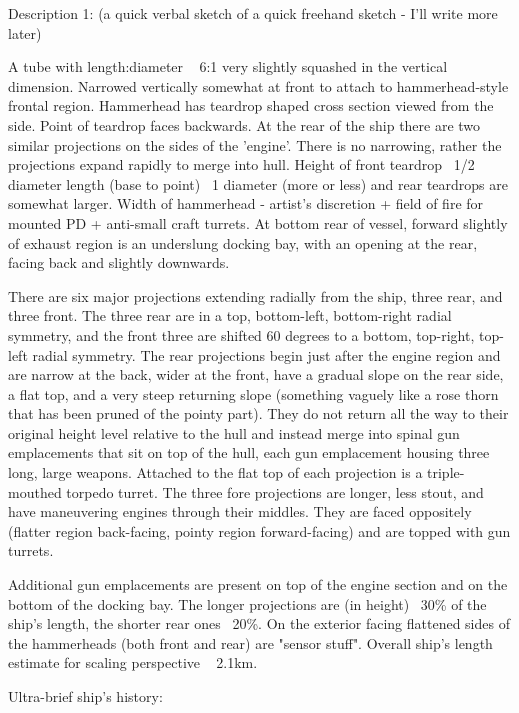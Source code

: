 Description 1: (a quick verbal sketch of a quick freehand sketch -
I'll write more later)

A tube with length:diameter ~ 6:1 very slightly squashed in the
vertical dimension. Narrowed vertically somewhat at front to attach to
hammerhead-style frontal region. Hammerhead has teardrop shaped cross
section viewed from the side. Point of teardrop faces backwards. At
the rear of the ship there are two similar projections on the sides of
the 'engine'. There is no narrowing, rather the projections expand
rapidly to merge into hull. Height of front teardrop ~1/2 diameter
length (base to point) ~1 diameter (more or less) and rear teardrops
are somewhat larger. Width of hammerhead - artist's discretion + field
of fire for mounted PD + anti-small craft turrets. At bottom rear of
vessel, forward slightly of exhaust region is an underslung docking
bay, with an opening at the rear, facing back and slightly downwards.

There are six major projections extending radially from the ship,
three rear, and three front. The three rear are in a top, bottom-left,
bottom-right radial symmetry, and the front three are shifted 60
degrees to a bottom, top-right, top-left radial symmetry. The rear
projections begin just after the engine region and are narrow at the
back, wider at the front, have a gradual slope on the rear side, a
flat top, and a very steep returning slope (something vaguely like a
rose thorn that has been pruned of the pointy part). They do not
return all the way to their original height level relative to the hull
and instead merge into spinal gun emplacements that sit on top of the
hull, each gun emplacement housing three long, large weapons.
Attached to the flat top of each projection is a triple-mouthed
torpedo turret. The three fore projections are longer, less stout, and
have maneuvering engines through their middles. They are faced
oppositely (flatter region back-facing, pointy region forward-facing)
and are topped with gun turrets.

Additional gun emplacements are present on top of the engine section
and on the bottom of the docking bay. The longer projections are (in
height) ~30\% of the ship's length, the shorter rear ones ~20\%. On
the exterior facing flattened sides of the hammerheads (both front and
rear) are "sensor stuff". Overall ship's length estimate for scaling
perspective ~ 2.1km.

Ultra-brief ship's history:\\ 

